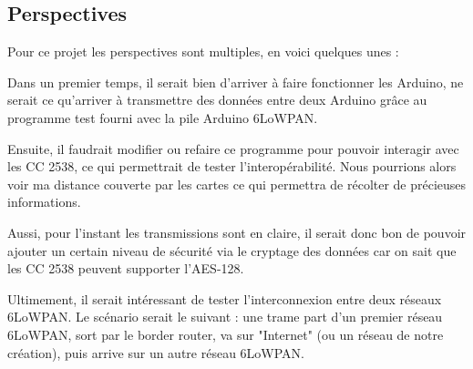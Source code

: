 
\subsection{Perspectives}

Pour ce projet les perspectives sont multiples, en voici quelques unes :

Dans un premier temps, il serait bien d'arriver à faire fonctionner les Arduino, ne serait ce qu'arriver à transmettre des données entre deux Arduino grâce au programme test fourni avec la pile Arduino 6LoWPAN.

Ensuite, il faudrait modifier ou refaire ce programme pour pouvoir interagir avec les CC 2538, ce qui permettrait de tester l'interopérabilité. Nous pourrions alors voir ma distance couverte par les cartes ce qui permettra de récolter de précieuses informations.

Aussi, pour l'instant les transmissions sont en claire, il serait donc bon de pouvoir ajouter un certain niveau de sécurité via le cryptage des données car on sait que les CC 2538 peuvent supporter l'AES-128.

Ultimement, il serait intéressant de tester l'interconnexion entre deux réseaux 6LoWPAN. Le scénario serait le suivant : une trame part d'un premier réseau 6LoWPAN, sort par le border router, va sur "Internet" (ou un réseau de notre création), puis arrive sur un autre réseau 6LoWPAN.
